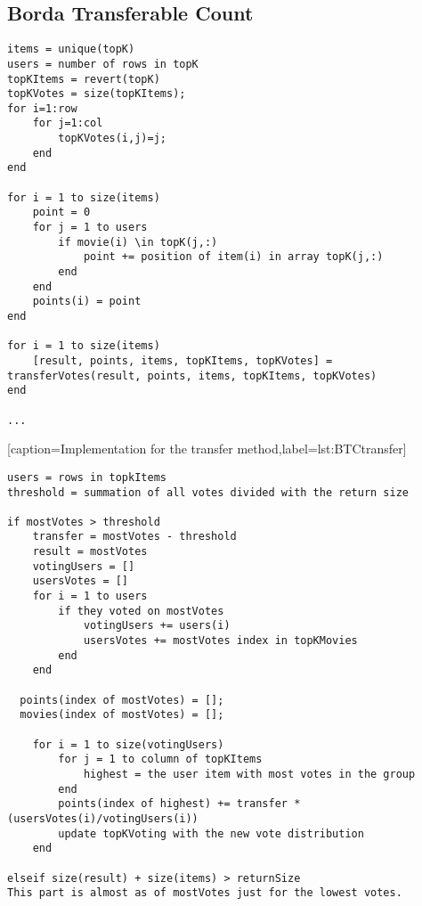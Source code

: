\subsection{Borda Transferable Count} \label{sec:BTC}
\begin{lstlisting}[caption={Borda transferable count implementation},label=lst:BTC]
items = unique(topK)
users = number of rows in topK
topKItems = revert(topK)
topKVotes = size(topKItems);
for i=1:row
    for j=1:col
        topKVotes(i,j)=j;
    end 
end

for i = 1 to size(items)
	point = 0
	for j = 1 to users
		if movie(i) \in topK(j,:)
			point += position of item(i) in array topK(j,:)
		end
	end
	points(i) = point
end

for i = 1 to size(items)
	[result, points, items, topKItems, topKVotes] = transferVotes(result, points, items, topKItems, topKVotes)
end
	
...
\end{lstlisting}[caption={Implementation for the transfer method},label=lst:BTCtransfer]

\begin{lstlisting}
users = rows in topkItems
threshold = summation of all votes divided with the return size

if mostVotes > threshold
	transfer = mostVotes - threshold
	result = mostVotes
	votingUsers = []
	usersVotes = []
	for i = 1 to users 
		if they voted on mostVotes
			votingUsers += users(i)
			usersVotes += mostVotes index in topKMovies
		end
	end
	
  points(index of mostVotes) = [];
  movies(index of mostVotes) = [];
	
	for i = 1 to size(votingUsers)
		for j = 1 to column of topKItems
			highest = the user item with most votes in the group
		end
		points(index of highest) += transfer * (usersVotes(i)/votingUsers(i))
		update topKVoting with the new vote distribution 
	end
	
elseif size(result) + size(items) > returnSize
This part is almost as of mostVotes just for the lowest votes.

\end{lstlisting}